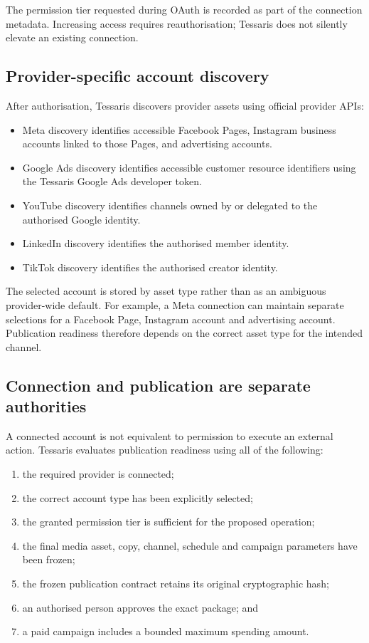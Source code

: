The permission tier requested during OAuth is recorded as part of the connection metadata. Increasing access requires reauthorisation; Tessaris does not silently elevate an existing connection.

\subsection{Provider-specific account discovery}

After authorisation, Tessaris discovers provider assets using official provider APIs:

\begin{itemize}
    \item Meta discovery identifies accessible Facebook Pages, Instagram business accounts linked to those Pages, and advertising accounts.
    \item Google Ads discovery identifies accessible customer resource identifiers using the Tessaris Google Ads developer token.
    \item YouTube discovery identifies channels owned by or delegated to the authorised Google identity.
    \item LinkedIn discovery identifies the authorised member identity.
    \item TikTok discovery identifies the authorised creator identity.
\end{itemize}

The selected account is stored by asset type rather than as an ambiguous provider-wide default. For example, a Meta connection can maintain separate selections for a Facebook Page, Instagram account and advertising account. Publication readiness therefore depends on the correct asset type for the intended channel.

\subsection{Connection and publication are separate authorities}

A connected account is not equivalent to permission to execute an external action. Tessaris evaluates publication readiness using all of the following:

\begin{enumerate}
    \item the required provider is connected;
    \item the correct account type has been explicitly selected;
    \item the granted permission tier is sufficient for the proposed operation;
    \item the final media asset, copy, channel, schedule and campaign parameters have been frozen;
    \item the frozen publication contract retains its original cryptographic hash;
    \item an authorised person approves the exact package; and
    \item a paid campaign includes a bounded maximum spending amount.
\end{enumerate}

